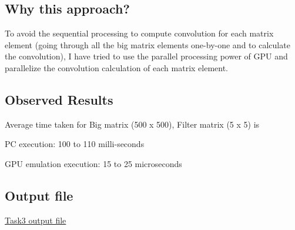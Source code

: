 \documentclass[]{article}
\begin{document}
 \subsection{Why this approach?}
 
 To avoid the sequential processing to compute convolution for each matrix element (going through all the big matrix elements one-by-one and to calculate the convolution), I have tried to use the parallel processing power of GPU and parallelize the convolution calculation of each matrix element.
 
 \subsection{Observed Results}
      Average time taken for Big matrix (500 x 500), Filter matrix (5 x 5) is
      
      \begin{list}{*}{}
      	\item PC execution:  100 to 110 milli-seconds
      	\item GPU emulation execution: 15 to 25 microseconds
      \end{list} 
      
 
 \subsection{Output file}
 \href{./Task3_data.txt}{Task3 output file}
 
\end{document}
